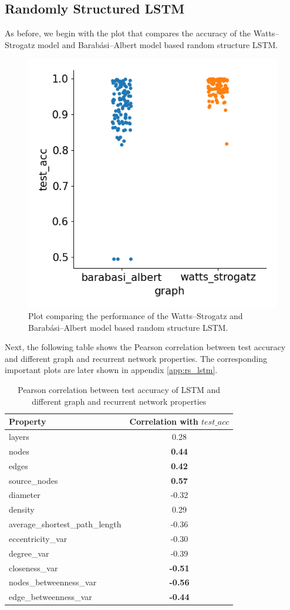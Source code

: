 \subsection{Randomly Structured LSTM}

As before, we begin with the plot that compares the accuracy of the Watts–Strogatz model and Barabási–Albert model based random structure LSTM.

\begin{figure}[H]
	\centering
	\includegraphics[width=0.45\linewidth]{images/results/random/lstm/graph_test_acc.png}
	\caption[Performance of the WS and BA based random structure LSTM]%
	{Plot comparing the performance of the Watts–Strogatz and Barabási–Albert model based random structure LSTM.}
	\label{fig:lstm_acc_comp}
\end{figure}

Next, the following table shows the Pearson correlation between test accuracy and different graph and recurrent network properties. The corresponding important plots are later shown in appendix \ref{app:rs_lstm}.

\begin{table}[h]
	\centering
	\begin{tabular}{|l|c|}
	    \hline
		\textbf{Property} & \textbf{Correlation with $test\_acc$}\\
		\hline
		layers & 0.28\\
		nodes & \textbf{0.44}\\
		edges & \textbf{0.42}\\
		source\_nodes & \textbf{0.57}\\
		diameter & -0.32\\
		density & 0.29\\
		average\_shortest\_path\_length & -0.36\\
		eccentricity\_var & -0.30\\
		degree\_var & -0.39\\
		closeness\_var & \textbf{-0.51}\\
		nodes\_betweenness\_var & \textbf{-0.56}\\
		edge\_betweenness\_var & \textbf{-0.44}\\
		\hline
	\end{tabular}
	\caption[Pearson correlation between test accuracy of LSTM and different graph and recurrent network properties]{Pearson correlation between test accuracy of LSTM and different graph and recurrent network properties}
	\label{tab:lstm_corr}
\end{table}

